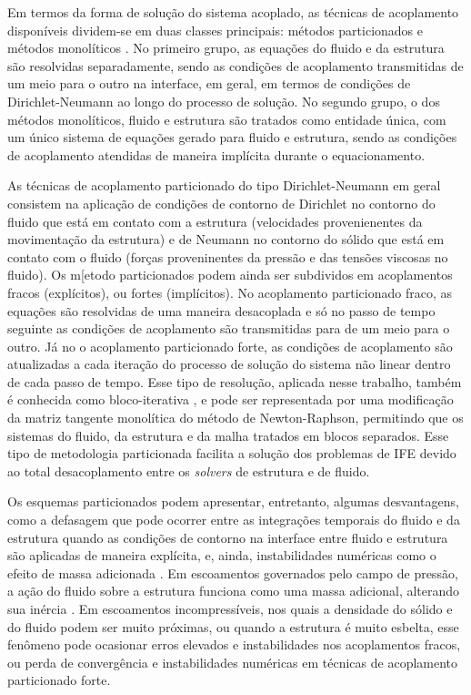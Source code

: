 \documentclass[tese_patricia.tex]{subfiles}
\begin{document}
Em termos da forma de solução do sistema acoplado, as técnicas de acoplamento disponíveis dividem-se em duas classes principais: métodos particionados \cite{RouxG:2009,BazilevsHKWB:2011, SanchesC:2013,SanchesC:2014,FernandesCS:2019} e métodos monolíticos \cite{Blom:1998,Hubneretal:2004,HronM:2007,Avancini:2023}. No primeiro grupo, as equações do fluido e da estrutura são resolvidas separadamente, sendo as condições de acoplamento transmitidas de um meio para o outro na interface, em geral, em termos de condições de Dirichlet-Neumann ao longo do processo de solução. No segundo grupo, o dos métodos monolíticos, fluido e estrutura são tratados como entidade única, com um único sistema de equações gerado para fluido e estrutura, sendo as condições de acoplamento atendidas de maneira implícita durante o equacionamento.

As técnicas de acoplamento particionado do tipo Dirichlet-Neumann em geral consistem na aplicação de condições de contorno de Dirichlet no contorno do fluido que está em contato com a estrutura (velocidades provenienentes da movimentação da estrutura) e de Neumann no contorno do sólido que está em contato com o fluido (forças proveninentes da pressão e das tensões viscosas no fluido). Os m[etodo particionados podem ainda ser subdividos em acoplamentos fracos (explícitos), ou fortes (implícitos). No acoplamento particionado fraco, as equações são resolvidas de uma maneira desacoplada e só no passo de tempo seguinte as condições de acoplamento são transmitidas para de um meio para o outro. Já no o acoplamento particionado forte, as condições de acoplamento são atualizadas a cada iteração do processo de solução do sistema não linear dentro de cada passo de tempo. Esse tipo de resolução, aplicada nesse trabalho, também é conhecida como bloco-iterativa \cite{BazilevsTT:2013}, e pode ser representada por uma  modificação da matriz tangente monolítica do método de Newton-Raphson, permitindo que os sistemas do fluido, da estrutura e da malha tratados em blocos separados. Esse tipo de metodologia particionada facilita a solução dos problemas de IFE devido ao total desacoplamento entre os \textit{solvers} de estrutura e de fluido.

Os esquemas particionados podem apresentar, entretanto, algumas desvantagens, como a defasagem que pode ocorrer entre as integrações temporais do fluido e da estrutura quando as condições de contorno na interface entre fluido e estrutura são aplicadas de maneira explícita, e, ainda, instabilidades numéricas como o efeito de massa adicionada \cite{FelippaPF:2001}. Em escoamentos governados pelo campo de pressão, a ação do fluido sobre a estrutura funciona como uma massa adicional, alterando sua inércia \cite{TallecM:2001}. Em escoamentos incompressíveis, nos quais a densidade do sólido e do fluido podem ser muito próximas, ou quando a estrutura é muito esbelta, esse fenômeno pode ocasionar erros elevados e instabilidades nos acoplamentos fracos, ou  perda de convergência e instabilidades numéricas em técnicas de acoplamento particionado forte. 
\end{document}
